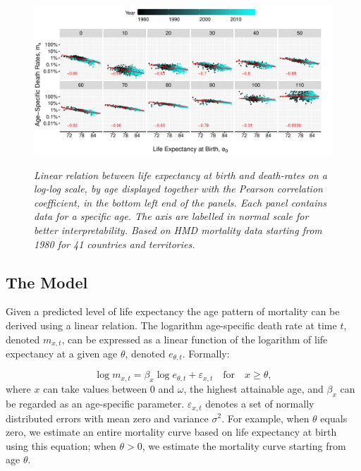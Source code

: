 \documentclass[risks,article,submit,moreauthors,pdftex]{Definitions/mdpi}
\begin{document}
\begin{figure}[!t]

{\centering \includegraphics[width=1\linewidth]{Figure1-1}}

\caption{\textit{Linear relation between life expectancy at birth and death-rates on a log-log scale, by age displayed together with the Pearson correlation coefficient, in the bottom left end of the panels. Each panel contains data for a specific age. The axis are labelled in normal scale for better interpretability. Based on HMD mortality data starting from 1980 for 41 countries and territories.}}\label{fig:Figure1}
\end{figure}

\subsection{The Model}\label{sec:Methods}

Given a predicted level of life expectancy the age pattern of mortality can be derived using a linear relation. The logarithm age-specific death rate at time $t$, denoted $m_{x,t}$, can be expressed as a linear function of the logarithm of life expectancy at a given age $\theta$, denoted $e_{\theta,t}$. Formally:

\begin{equation}\label{eq:L1}
\log{m_{x,t}} = \beta_x\log{e_{\theta,t}} + \varepsilon_{x,t} \quad \textrm{for} \quad x \geq \theta,
\end{equation}
where $x$ can take values between 0 and  $\omega$, the highest attainable age, and $\beta_{x}$ can be regarded as an age-specific parameter. $\varepsilon_{x,t}$ denotes a set of normally distributed errors with mean zero and variance $\sigma^2$. For example, when $\theta$ equals zero, we estimate an entire mortality curve based on life expectancy at birth using this equation; when $\theta > 0$, we estimate the mortality curve starting from age $\theta$.
\end{document}
